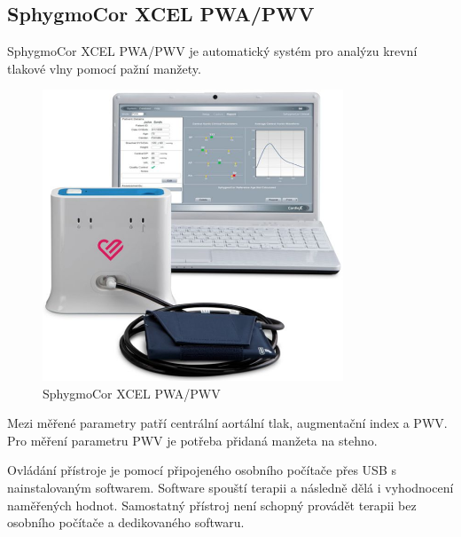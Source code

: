 \subsection{SphygmoCor XCEL PWA/PWV}
SphygmoCor XCEL PWA/PWV je automatický systém pro analýzu krevní tlakové vlny pomocí pažní manžety.
\cite{cite:SphygmoCor}
\begin{figure}[H]
    \caption{SphygmoCor XCEL PWA/PWV \cite{cite:SphygmoCor}}
    \includegraphics[width=0.8\textwidth]{pictures/XCEL_System.jpg}
\end{figure}
Mezi měřené parametry patří centrální aortální tlak, augmentační index a PWV. Pro měření parametru PWV je potřeba přidaná manžeta na stehno.
\cite{cite:SphygmoCor}
\par
Ovládání přístroje je pomocí připojeného osobního počítače přes USB s nainstalovaným softwarem. Software spouští terapii a následně dělá i vyhodnocení naměřených hodnot. Samostatný přístroj není schopný provádět terapii bez osobního počítače a dedikovaného softwaru.
\cite{cite:SphygmoCor}
